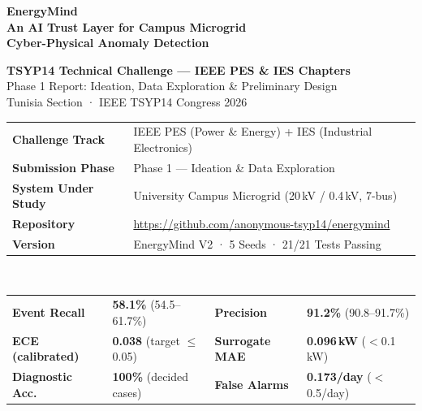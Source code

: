 \documentclass[12pt, a4paper]{article}
\begin{document}

\begin{titlepage}
\centering
\vspace*{2cm}

{\Huge\bfseries\color{AccentBlue} EnergyMind}\\[0.4cm]
{\Large\bfseries An AI Trust Layer for Campus Microgrid\\Cyber-Physical Anomaly Detection}\\[1.0cm]

\begin{tcolorbox}[colback=AccentBlue!8, colframe=AccentBlue!40, boxrule=0.8pt, arc=6pt,
  width=0.85\linewidth]
\centering
{\large\bfseries TSYP14 Technical Challenge — IEEE PES \& IES Chapters}\\[0.3cm]
{\normalsize Phase 1 Report: Ideation, Data Exploration \& Preliminary Design}\\[0.2cm]
{\small\color{TextDark!60} Tunisia Section · IEEE TSYP14 Congress 2026}
\end{tcolorbox}

\vspace{1.0cm}

\begin{tabularx}{0.95\linewidth}{p{4.2cm}X}
\toprule
\textbf{Challenge Track} & IEEE PES (Power \& Energy) + IES (Industrial Electronics)\\
\textbf{Submission Phase} & Phase 1 — Ideation \& Data Exploration\\
\textbf{System Under Study} & University Campus Microgrid (20\,kV / 0.4\,kV, 7-bus)\\
\textbf{Repository} & \url{https://github.com/anonymous-tsyp14/energymind}\\
\textbf{Version} & EnergyMind V2 · 5 Seeds · 21/21 Tests Passing\\
\bottomrule
\end{tabularx}

\vspace{1.2cm}

\begin{tcolorbox}[resultbox, width=\linewidth]
\\[0.3cm]
\normalfont\small
\begin{tabularx}{0.95\linewidth}{p{3.0cm}X|p{3.2cm}X}
\toprule
\textbf{Event Recall} & \textbf{58.1\%} (54.5--61.7\%) & \textbf{Precision} & \textbf{91.2\%} (90.8--91.7\%)\\
\textbf{ECE (calibrated)} & \textbf{0.038} (target $\le$0.05) & \textbf{Surrogate MAE} & \textbf{0.096\,kW} ($<$0.1\,kW)\\
\textbf{Diagnostic Acc.} & \textbf{100\%} (decided cases) & \textbf{False Alarms} & \textbf{0.173/day} ($<$0.5/day)\\
\bottomrule
\end{tabularx}
\end{tcolorbox}


\end{titlepage}
\end{document}
